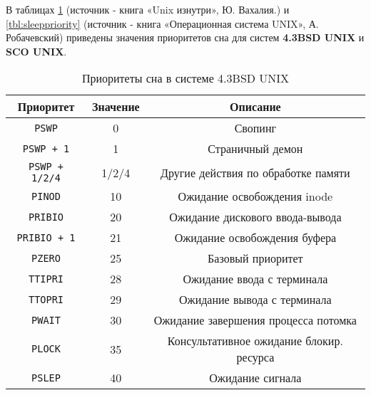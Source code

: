 В таблицах \ref{tab:bsd} (источник - книга «Unix изнутри», Ю. Вахалия.) и \ref{tbl:sleeppriority} (источник - книга «Операционная система UNIX», А. Робачевский) приведены значения приоритетов сна для систем \textbf{4.3BSD UNIX} и \textbf{SCO UNIX}.

\newpage
\begin{table}[h]
	\caption{Приоритеты сна в системе 4.3BSD UNIX}
	\label{tab:bsd}
	\begin{center}
		\begin{tabular}{ |c|c|c|  }
			\hline
			\textbf{Приоритет} & \textbf{Значение} & \textbf{Описание} \\
			\hline
			\texttt{PSWP} & 0 & Свопинг \\
			\hline
			\texttt{PSWP + 1} & 1 & Страничный демон \\
			\hline
			\texttt{PSWP + 1/2/4} & 1/2/4 & Другие действия по обработке памяти \\
			\hline
			\texttt{PINOD} & 10 & Ожидание освобождения inode \\
			\hline
			\texttt{PRIBIO} & 20 & Ожидание дискового ввода-вывода \\
			\hline
			\texttt{PRIBIO + 1} & 21 & Ожидание освобождения буфера \\
			\hline
			\texttt{PZERO} & 25 & Базовый приоритет \\
			\hline
			\texttt{TTIPRI} & 28 & Ожидание ввода с терминала \\
			\hline
			\texttt{TTOPRI} & 29 & Ожидание вывода с терминала \\
			\hline 
			\texttt{PWAIT} & 30 & Ожидание завершения процесса потомка \\
			\hline
			\texttt{PLOCK} & 35 & Консультативное ожидание блокир. ресурса \\
			\hline
			\texttt{PSLEP} & 40 & Ожидание сигнала \\
			\hline
		\end{tabular}
	\end{center}
\end{table}

